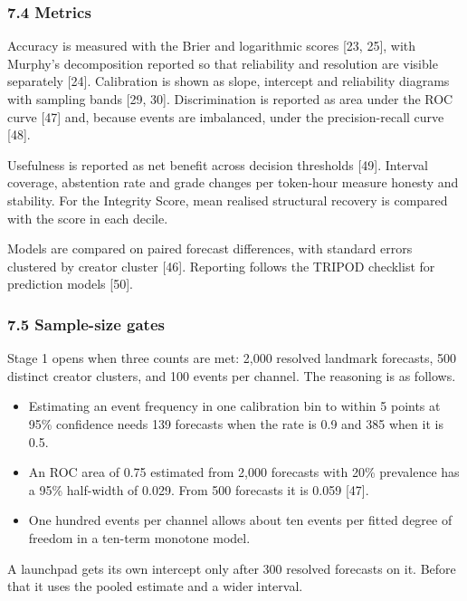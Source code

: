 \subsubsection{7.4 Metrics}\label{metrics}

Accuracy is measured with the Brier and logarithmic scores {[}23, 25{]}, with Murphy's decomposition reported so that reliability and resolution are visible separately {[}24{]}. Calibration is shown as slope, intercept and reliability diagrams with sampling bands {[}29, 30{]}. Discrimination is reported as area under the ROC curve {[}47{]} and, because events are imbalanced, under the precision-recall curve {[}48{]}.

Usefulness is reported as net benefit across decision thresholds {[}49{]}. Interval coverage, abstention rate and grade changes per token-hour measure honesty and stability. For the Integrity Score, mean realised structural recovery is compared with the score in each decile.

Models are compared on paired forecast differences, with standard errors clustered by creator cluster {[}46{]}. Reporting follows the TRIPOD checklist for prediction models {[}50{]}.

\subsubsection{7.5 Sample-size gates}\label{sample-size-gates}

Stage 1 opens when three counts are met: 2,000 resolved landmark forecasts, 500 distinct creator clusters, and 100 events per channel. The reasoning is as follows.

\begin{itemize}
\tightlist
\item
  Estimating an event frequency in one calibration bin to within 5 points at 95\% confidence needs 139 forecasts when the rate is 0.9 and 385 when it is 0.5.
\item
  An ROC area of 0.75 estimated from 2,000 forecasts with 20\% prevalence has a 95\% half-width of 0.029. From 500 forecasts it is 0.059 {[}47{]}.
\item
  One hundred events per channel allows about ten events per fitted degree of freedom in a ten-term monotone model.
\end{itemize}

A launchpad gets its own intercept only after 300 resolved forecasts on it. Before that it uses the pooled estimate and a wider interval.

